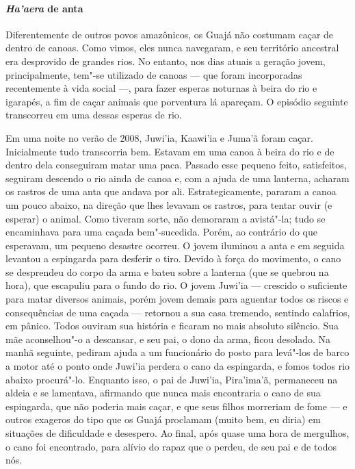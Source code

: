 \paragraph{\emph{Ha'aera} de anta}

Diferentemente de outros povos amazônicos, os Guajá não costumam caçar
de dentro de canoas. Como vimos, eles nunca navegaram, e seu território
ancestral era desprovido de grandes rios. No entanto, nos dias atuais a
geração jovem, principalmente, tem"-se utilizado de canoas --- que foram
incorporadas recentemente à vida social ---, para fazer esperas noturnas à
beira do rio e igarapés, a fim de caçar animais que porventura lá
apareçam. O episódio seguinte transcorreu em uma dessas esperas de rio.

Em uma noite no verão de 2008, Juwi'ia, Kaawi'ia e Juma'ã foram caçar.
Inicialmente tudo transcorria bem. Estavam em uma canoa à beira do rio e
de dentro dela conseguiram matar uma paca. Passado esse pequeno feito,
satisfeitos, seguiram descendo o rio ainda de canoa e, com a ajuda de
uma lanterna, acharam os rastros de uma anta que andava por ali.
Estrategicamente, pararam a canoa um pouco abaixo, na direção que lhes
levavam os rastros, para tentar ouvir (e esperar) o animal. Como tiveram
sorte, não demoraram a avistá"-la; tudo se encaminhava para uma caçada
bem"-sucedida. Porém, ao contrário do que esperavam, um pequeno desastre
ocorreu. O jovem iluminou a anta e em seguida levantou a espingarda para
desferir o tiro. Devido à força do movimento, o cano se desprendeu do
corpo da arma e bateu sobre a lanterna (que se quebrou na hora), que
escapuliu para o fundo do rio. O jovem Juwi'ia --- crescido o suficiente
para matar diversos animais, porém jovem demais para aguentar todos os
riscos e consequências de uma caçada --- retornou a sua casa tremendo,
sentindo calafrios, em pânico. Todos ouviram sua história e ficaram no
mais absoluto silêncio. Sua mãe aconselhou"-o a descansar, e seu pai, o
dono da arma, ficou desolado. Na manhã seguinte, pediram ajuda a um
funcionário do posto para levá"-los de barco a motor até o ponto onde
Juwi'ia perdera o cano da espingarda, e fomos todos rio abaixo
procurá"-lo. Enquanto isso, o pai de Juwi'ia, Pira'ima'ã, permaneceu na
aldeia e se lamentava, afirmando que nunca mais encontraria o cano de
sua espingarda, que não poderia mais caçar, e que seus filhos morreriam
de fome --- e outros exageros do tipo que os Guajá proclamam (muito bem,
eu diria) em situações de dificuldade e desespero. Ao final, após quase
uma hora de mergulhos, o cano foi encontrado, para alívio do rapaz que o
perdeu, de seu pai e de todos nós.

